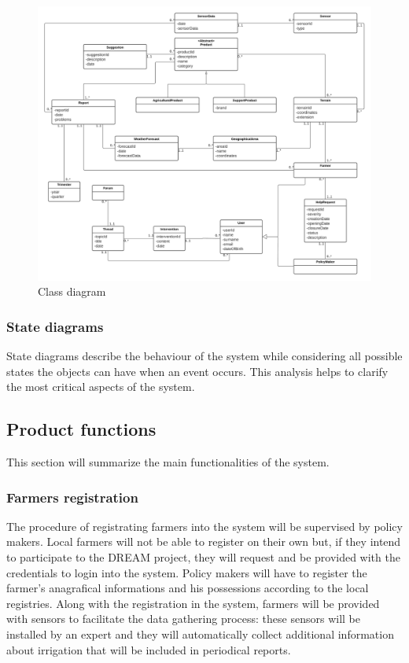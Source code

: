 \documentclass[10pt]{article}
\begin{document}
\begin{figure}[ht!]
    \centering
    \includegraphics[scale=0.45]{classDiagram.png}
    \caption{Class diagram}
    \label{fig:classDiagram}
\end{figure}
\newpage
\subsubsection{State diagrams}
State diagrams describe the behaviour of the system while considering all possible states the objects can have when an event occurs. This analysis helps to clarify the most critical aspects of the system.
\subsection{Product functions}
This section will summarize the main functionalities of the system.
\subsubsection{Farmers registration}
The procedure of registrating farmers into the system will be supervised by policy makers. Local farmers will not be able to register on their own
but, if they intend to participate to the DREAM project, they will request and be provided with the credentials to login into the system. Policy makers will have to 
register the farmer's anagrafical informations and his possessions according to the local registries. Along with the registration in the system, farmers will be provided with
sensors to facilitate the data gathering process: these sensors will be installed by an expert and they will automatically collect additional information about irrigation that 
will be included in periodical reports.
\end{document}
